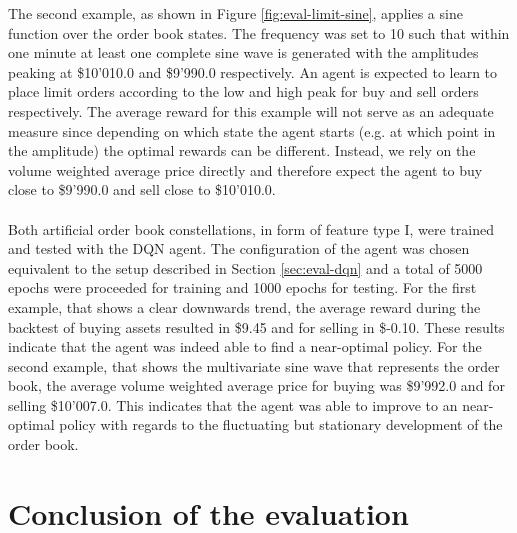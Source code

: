 The second example, as shown in Figure \ref{fig:eval-limit-sine}, applies a sine function over the order book states.
The frequency was set to 10 such that within one minute at least one complete sine wave is generated with the amplitudes peaking at \$10'010.0 and \$9'990.0 respectively.
An agent is expected to learn to place limit orders according to the low and high peak for buy and sell orders respectively.
The average reward for this example will not serve as an adequate measure since depending on which state the agent starts (e.g. at which point in the amplitude) the optimal rewards can be different.
Instead, we rely on the volume weighted average price directly and therefore expect the agent to buy close to \$9'990.0 and sell close to \$10'010.0.
\\
\\
Both artificial order book constellations, in form of feature type I, were trained and tested with the DQN agent.
The configuration of the agent was chosen equivalent to the setup described in Section \ref{sec:eval-dqn} and a total of 5000 epochs were proceeded for training and 1000 epochs for testing.
For the first example, that shows a clear downwards trend, the average reward during the backtest of buying assets resulted in \$9.45 and for selling in \$-0.10.
These results indicate that the agent was indeed able to find a near-optimal policy.
For the second example, that shows the multivariate sine wave that represents the order book, the average volume weighted average price for buying was \$9'992.0 and for selling \$10'007.0.
This indicates that the agent was able to improve to an near-optimal policy with regards to the fluctuating but stationary development of the order book.

\section{Conclusion of the evaluation}

